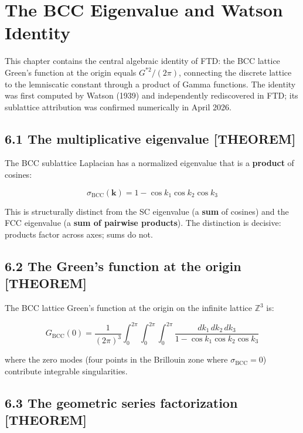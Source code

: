 \documentclass[
  11pt,
  letterpaper,
  twoside,
  openright]{book}
\begin{document}
\chapter{The BCC Eigenvalue and Watson Identity}\label{sec-bcc}

This chapter contains the central algebraic identity of FTD: the BCC
lattice Green's function at the origin equals \(G^{*2}/(2\pi)\),
connecting the discrete lattice to the lemniscatic constant through a
product of Gamma functions. The identity was first computed by Watson
(1939) and independently rediscovered in FTD; its sublattice attribution
was confirmed numerically in April 2026.

\section{6.1 The multiplicative eigenvalue
{[}THEOREM{]}}\label{the-multiplicative-eigenvalue-theorem}

The BCC sublattice Laplacian has a normalized eigenvalue that is a
\textbf{product} of cosines:

\[
\sigma_{\text{BCC}}(\mathbf{k}) = 1 - \cos k_1 \cos k_2 \cos k_3
\tag{6.1}
\]

This is structurally distinct from the SC eigenvalue (a \textbf{sum} of
cosines) and the FCC eigenvalue (a \textbf{sum of pairwise products}).
The distinction is decisive: products factor across axes; sums do not.

\section{6.2 The Green's function at the origin
{[}THEOREM{]}}\label{the-greens-function-at-the-origin-theorem}

The BCC lattice Green's function at the origin on the infinite lattice
\(\mathbb{Z}^3\) is:

\[
G_{\text{BCC}}(0) = \frac{1}{(2\pi)^3} \int_0^{2\pi} \!\! \int_0^{2\pi} \!\! \int_0^{2\pi} \frac{dk_1 \, dk_2 \, dk_3}{1 - \cos k_1 \cos k_2 \cos k_3}
\tag{6.2}
\]

where the zero modes (four points in the Brillouin zone where
\(\sigma_{\text{BCC}} = 0\)) contribute integrable singularities.

\section{6.3 The geometric series factorization
{[}THEOREM{]}}\label{the-geometric-series-factorization-theorem}
\end{document}
